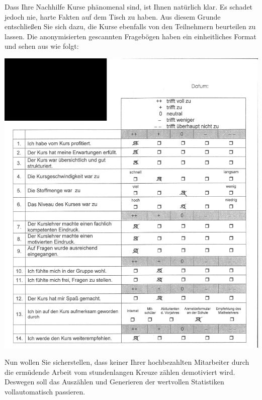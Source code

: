 \vspace{-1.5em}

Dass Ihre Nachhilfe Kurse phänomenal sind, ist Ihnen natürlich klar. Es schadet jedoch nie, harte Fakten auf dem Tisch zu haben. 
Aus diesem Grunde entschließen Sie sich dazu, die Kurse ebenfalls von den Teilnehmern beurteilen zu lassen. 
Die anonymisierten gescannten Fragebögen haben ein einheitliches Format und sehen aus wie folgt:\\
\begin{center}
\includegraphics[scale=0.09]{bilder/bogen_example.jpg}
\end{center}

Nun wollen Sie sicherstellen, dass keiner Ihrer hochbezahlten Mitarbeiter durch die ermüdende Arbeit vom stundenlangen Kreuze zählen demotiviert wird. 
Deswegen soll das Auszählen und Generieren der wertvollen Statistiken vollautomatisch passieren.

